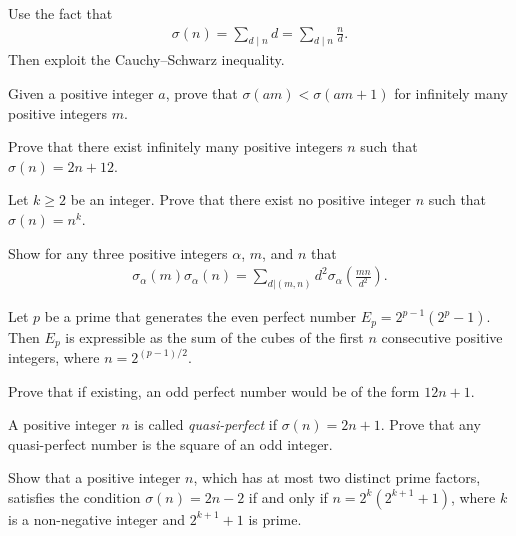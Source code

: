 \documentclass[12pt]{subfile}
\begin{document}
	\begin{hint}
		Use the fact that
			\begin{align*}
				\sigma(n)=\sum\limits_{d\mid n} d =  \sum\limits_{d\mid n} \frac{n}{d}.
			\end{align*}
		Then exploit the Cauchy--Schwarz inequality.
	\end{hint}

		\begin{problem}[Romania TST 2010] %
		Given a positive integer $a$, prove that $\sigma(am) < \sigma(am + 1)$ for infinitely many positive integers $m$.
	\end{problem}

	\begin{problem}
		Prove that there exist infinitely many positive integers $n$ such that $\sigma(n)=2n+12$.
	\end{problem}

	\begin{problem}
		Let $k\geq 2$ be an integer. Prove that there exist no positive integer $n$ such that $\sigma(n)=n^k$.
	\end{problem}

	\begin{problem}
		Show for any three positive integers $\alpha$, $m$, and $n$ that
			\begin{align*}
				\sigma_{\alpha} (m)\sigma_{\alpha} (n) = \sum_{d|(m,n)} d^2 \sigma_{\alpha} \left(\frac{mn}{d^2}\right).
			\end{align*}
	\end{problem}
	\begin{problem}%
		Let $p$ be a prime that generates the even perfect number $E_p=2^{p-1}(2^p-1)$. Then $E_p$ is expressible as the sum of the cubes of the first $n$ consecutive positive integers, where $n=2^{(p-1)/2}$.
	\end{problem}

	\begin{problem}
		Prove that if existing, an odd perfect number would be of the form $12n+1$.
	\end{problem}

	\begin{problem}[Putnam 1976]
		A positive integer $n$ is called \textit{quasi-perfect} if $\sigma(n)=2n+1$. Prove that any quasi-perfect number is the square of an odd integer.
	\end{problem}


	\begin{problem}
		Show that a positive integer $n$, which has at most two distinct prime factors, satisfies the condition $\sigma(n)=2n-2$ if and only if $n=2^k(2^{k+1}+1)$, where $k$ is a non-negative integer and $2^{k+1}+1$ is prime.
	\end{problem}
\end{document}
